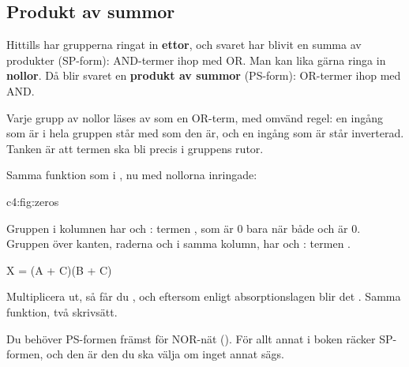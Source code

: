 \subsection{Produkt av summor}
\label{c4:a10}
Hittills har grupperna ringat in \textbf{ettor}, och svaret har blivit en summa av produkter
(SP-form): AND-termer ihop med OR. Man kan lika gärna ringa in \textbf{nollor}. Då blir svaret en
\textbf{produkt av summor} (PS-form): OR-termer ihop med AND.

Varje grupp av nollor läses av som en OR-term, med omvänd regel: en ingång som är  i hela
gruppen står med som den är, och en ingång som är  står inverterad. Tanken är att termen ska
bli  precis i gruppens rutor.

Samma funktion som i , nu med nollorna inringade:

%
{c4:fig:zeros}

\noindent Gruppen  i kolumnen  har  och :
termen , som är 0 bara när både  och  är 0. Gruppen över kanten,
raderna  och  i samma kolumn, har  och : termen
.

\begin{console}
X = (A + C)(B + C)
\end{console}

\noindent Multiplicera ut, så får du , och eftersom 
enligt absorptionslagen blir det . Samma funktion, två skrivsätt.

Du behöver PS-formen främst för NOR-nät (). För allt annat i boken räcker SP-formen,
och den är den du ska välja om inget annat sägs.
